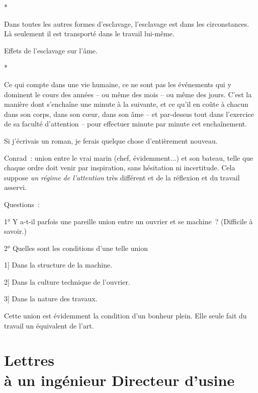 \documentclass[french,twoside]{book} %
\begin{document}
\begin{center}
*\end{center}
\noindent Dans toutes les autres formes d'esclavage, l'esclavage est dans les circonstances. Là seulement il est transporté dans le travail lui-même.\par
Effets de l'esclavage sur l'âme.\par

\begin{center}
*\end{center}
\noindent Ce qui compte dans une vie humaine, ce ne sont pas les événements qui y dominent le cours des années – ou même des mois – ou même des jours. C'est la manière dont s'enchaîne une minute à la suivante, et ce qu'il en coûte à chacun dans son corps, dans son cœur, dans son âme – et par-dessus tout dans l'exercice de sa faculté d'attention – pour effectuer minute par minute cet enchaînement.\par
Si j'écrivais un roman, je ferais quelque chose d'entièrement nouveau.\par
Conrad : union entre le vrai marin (chef, évidemment...) et son bateau, telle que chaque ordre doit venir par inspiration, sans hésitation ni incertitude. Cela suppose {\itshape un régime de l'attention} très différent et de la réflexion et du travail asservi.\par
Questions :\par
1° Y a-t-il parfois une pareille union entre un ouvrier et se machine ? (Difficile à savoir.)\par
2° Quelles sont les conditions d'une telle union\par
1] Dans la structure de la machine.\par
2] Dans la culture technique de l'ouvrier.\par
3] Dans la nature des travaux.\par
Cette union est évidemment la condition d'un bonheur plein. Elle seule fait du travail un équivalent de l'art.
\section[Lettres, à un ingénieur Directeur d'usine ]{Lettres \\
à un ingénieur Directeur d'usine \protect\footnotemark }\renewcommand{\leftmark}{Lettres \\
à un ingénieur Directeur d'usine }
\end{document}
